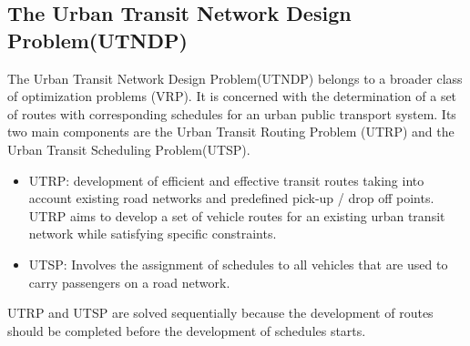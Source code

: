\subsection{The Urban Transit Network Design Problem(UTNDP)}
The Urban Transit Network Design Problem(UTNDP) belongs to a broader class of optimization problems (VRP). It is concerned with the determination of a set of routes with corresponding schedules for an urban public transport system. 
Its two main components are the Urban Transit Routing Problem (UTRP) and the Urban Transit Scheduling Problem(UTSP).
\begin{itemize}
\item UTRP: development of efficient and effective transit routes taking into account existing road networks and predefined pick-up / drop off points. UTRP aims to develop a set of vehicle routes for an existing urban transit network while satisfying specific constraints. 
\item UTSP: Involves the assignment of schedules to all vehicles that are used to carry passengers on a road network. 
\end{itemize}
UTRP and UTSP are solved sequentially because the development of routes should be completed before the development of schedules starts.
\citep{kechagiopoulos13}





